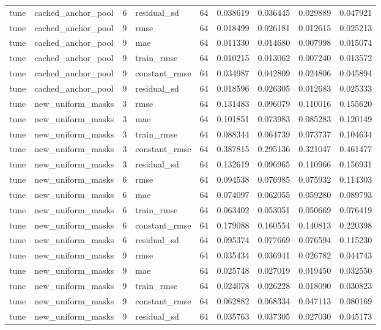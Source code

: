 \begin{tabular}{llrlrrrrr}
tune & cached_anchor_pool & 6 & residual_sd & 64 & 0.038619 & 0.036445 & 0.029889 & 0.047921 \\
tune & cached_anchor_pool & 9 & rmse & 64 & 0.018499 & 0.026181 & 0.012615 & 0.025213 \\
tune & cached_anchor_pool & 9 & mae & 64 & 0.011330 & 0.014680 & 0.007998 & 0.015074 \\
tune & cached_anchor_pool & 9 & train_rmse & 64 & 0.010215 & 0.013062 & 0.007240 & 0.013572 \\
tune & cached_anchor_pool & 9 & constant_rmse & 64 & 0.034987 & 0.042809 & 0.024806 & 0.045894 \\
tune & cached_anchor_pool & 9 & residual_sd & 64 & 0.018596 & 0.026305 & 0.012683 & 0.025333 \\
tune & new_uniform_masks & 3 & rmse & 64 & 0.131483 & 0.096079 & 0.110016 & 0.155620 \\
tune & new_uniform_masks & 3 & mae & 64 & 0.101851 & 0.073983 & 0.085283 & 0.120149 \\
tune & new_uniform_masks & 3 & train_rmse & 64 & 0.088344 & 0.064739 & 0.073737 & 0.104634 \\
tune & new_uniform_masks & 3 & constant_rmse & 64 & 0.387815 & 0.295136 & 0.321047 & 0.461477 \\
tune & new_uniform_masks & 3 & residual_sd & 64 & 0.132619 & 0.096965 & 0.110966 & 0.156931 \\
tune & new_uniform_masks & 6 & rmse & 64 & 0.094538 & 0.076985 & 0.075932 & 0.114303 \\
tune & new_uniform_masks & 6 & mae & 64 & 0.074097 & 0.062055 & 0.059280 & 0.089793 \\
tune & new_uniform_masks & 6 & train_rmse & 64 & 0.063402 & 0.053051 & 0.050669 & 0.076419 \\
tune & new_uniform_masks & 6 & constant_rmse & 64 & 0.179088 & 0.160554 & 0.140813 & 0.220398 \\
tune & new_uniform_masks & 6 & residual_sd & 64 & 0.095374 & 0.077669 & 0.076594 & 0.115230 \\
tune & new_uniform_masks & 9 & rmse & 64 & 0.035434 & 0.036941 & 0.026782 & 0.044743 \\
tune & new_uniform_masks & 9 & mae & 64 & 0.025748 & 0.027019 & 0.019450 & 0.032550 \\
tune & new_uniform_masks & 9 & train_rmse & 64 & 0.024078 & 0.026228 & 0.018090 & 0.030823 \\
tune & new_uniform_masks & 9 & constant_rmse & 64 & 0.062882 & 0.068334 & 0.047113 & 0.080169 \\
tune & new_uniform_masks & 9 & residual_sd & 64 & 0.035763 & 0.037305 & 0.027030 & 0.045173 \\
\bottomrule
\end{tabular}
